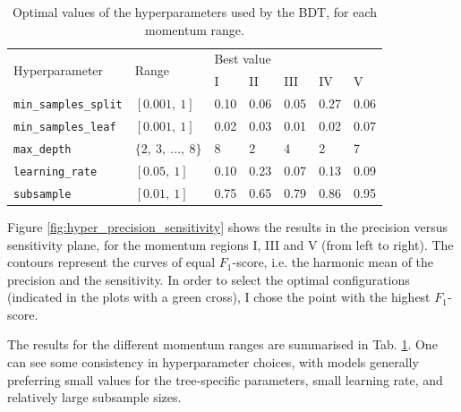 \begin{table}[t]
	\caption{Optimal values of the hyperparameters used by the BDT, for each momentum range.}
	\begin{center}
		\begin{small}
			\begin{tabular}{l|l|lllll}
				\multirow{2}{*}{Hyperparameter} & \multirow{2}{*}{Range} & \multicolumn{5}{l}{Best value}                           \\[1mm] \cline{3-7}
												&                        & \rule{0pt}{1.1\normalbaselineskip}I & II & III & IV & V \\[1mm]
												\hline
				\rule{0pt}{1.1\normalbaselineskip}\texttt{min_samples_split}      & $[0.001, ~1]$          & 0.10     & 0.06      & 0.05       & 0.27      & 0.06     \\[2mm]
				\texttt{min_samples_leaf}       & $[0.001, ~1]$          & 0.02     & 0.03      & 0.01       & 0.02      & 0.07     \\[2mm]
				\texttt{max_depth}              & $\{2, ~3, ~..., ~8\}$  & 8        & 2         & 4          & 2         & 7      \\[2mm]
				\texttt{learning_rate}          & $[0.05, ~1]$           & 0.10     & 0.23      & 0.07       & 0.13      & 0.09     \\[2mm]
				\texttt{subsample}              & $[0.01, ~1]$           & 0.75     & 0.65      & 0.79       & 0.86      & 0.95    
			\end{tabular}
		\end{small}
	\end{center}
	\label{tab:bdt_hyperpars}
\end{table}

Figure \ref{fig:hyper_precision_sensitivity} shows the results in the precision versus sensitivity plane, for the momentum regions I, III and V (from left to right). The contours represent the curves of equal $F_{1}$-score, i.e. the harmonic mean of the precision and the sensitivity. In order to select the optimal configurations (indicated in the plots with a green cross), I chose the point with the highest $F_{1}$-score.

The results for the different momentum ranges are summarised in Tab. \ref{tab:bdt_hyperpars}. One can see some consistency in hyperparameter choices, with models generally preferring small values for the tree-specific parameters, small learning rate, and relatively large subsample sizes.

